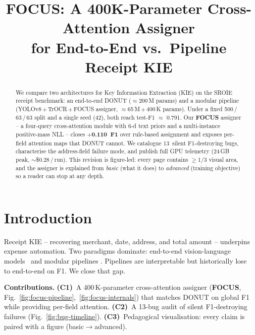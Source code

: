 \documentclass[conference]{IEEEtran}
\begin{document}
\title{FOCUS: A 400K-Parameter Cross-Attention Assigner\\for End-to-End vs.\ Pipeline Receipt KIE}

\author{
}

\maketitle

\begin{abstract}
We compare two architectures for Key Information Extraction (KIE) on
the SROIE receipt benchmark: an end-to-end DONUT
($\approx$200\,M params) and a modular pipeline
(YOLOv8\,$+$\,TrOCR\,$+$\,FOCUS assigner, $\approx$65\,M\,$+$\,400\,K params).
Under a fixed 500\,/\,63\,/\,63 split and a single seed (42), both reach
test-F1 $\approx$ 0.791. Our \textbf{FOCUS} assigner -- a four-query
cross-attention module with 6-d text priors and a multi-instance
positive-mass NLL -- closes \textbf{$+$0.110~F1} over rule-based assignment
and exposes per-field attention maps that DONUT cannot.
We catalogue 13~silent F1-destroying bugs, characterise the address-field
failure mode, and publish full GPU telemetry (24\,GB peak,
$\sim$\$0.28\,/\,run).
This revision is figure-led: every page contains $\geq$1/3 visual area,
and the assigner is explained from \emph{basic} (what it does) to
\emph{advanced} (training objective) so a reader can stop at any depth.
\end{abstract}

\section{Introduction}
Receipt KIE -- recovering merchant, date, address, and total amount --
underpins expense automation. Two paradigms dominate: end-to-end
vision-language models~\cite{kim2022donut} and modular pipelines
\cite{jocher2023yolov8,li2023trocr}. Pipelines are interpretable but
historically lose to end-to-end on F1. We close that gap.

\textbf{Contributions.} \textbf{(C1)}~A 400\,K-parameter cross-attention
assigner (\textbf{FOCUS}, Fig.~\ref{fig:focus-pipeline},~\ref{fig:focus-internals})
that matches DONUT on global F1 while providing per-field attention.
\textbf{(C2)}~A 13-bug audit of silent F1-destroying failures
(Fig.~\ref{fig:bug-timeline}). \textbf{(C3)}~Pedagogical visualisation:
every claim is paired with a figure (basic$\to$advanced).
\end{document}
